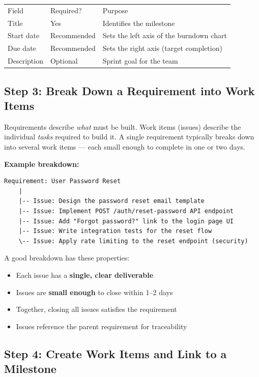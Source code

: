 \documentclass[11pt,a4paper]{book}
\begin{document}
\begin{tabular}{lll}
\hline
Field & Required? & Purpose \\
Title & Yes & Identifies the milestone \\
Start date & Recommended & Sets the left axis of the burndown chart \\
Due date & Recommended & Sets the right axis (target completion) \\
Description & Optional & Sprint goal for the team \\
\hline
\end{tabular}

\medskip

\subsection{Step 3: Break Down a Requirement into Work Items}

Requirements describe \textit{what} must be built. Work items (issues) describe the individual \textit{tasks} required to build it. A single requirement typically breaks down into several work items --- each small enough to complete in one or two days.

\textbf{Example breakdown:}

\begin{lstlisting}
Requirement: User Password Reset
    |
    |-- Issue: Design the password reset email template
    |-- Issue: Implement POST /auth/reset-password API endpoint
    |-- Issue: Add "Forgot password?" link to the login page UI
    |-- Issue: Write integration tests for the reset flow
    \-- Issue: Apply rate limiting to the reset endpoint (security)
\end{lstlisting}

A good breakdown has these properties:

\begin{itemize}
  \item Each issue has a \textbf{single, clear deliverable}
  \item Issues are \textbf{small enough} to close within 1--2 days
  \item Together, closing all issues satisfies the requirement
  \item Issues reference the parent requirement for traceability
\end{itemize}

\medskip

\subsection{Step 4: Create Work Items and Link to a Milestone}
\end{document}
